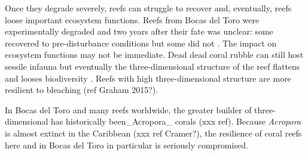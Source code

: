 \documentclass[]{book}
\begin{document}
Once they degrade severely, reefs can struggle to recover and,
eventually, reefs loose important ecosystem functions. Reefs from Bocas
del Toro were experimentally degraded and two years after their fate was
unclear: some recovered to pre-disturbance conditions but some did not
\citep{Schloder_etal_2013}. The impact on ecosystem functions may not be
immediate. Dead dead coral rubble can still host sessile infauna but
eventually the three-dimensional structure of the reef flattens and
looses biodiversity \citep{Nelson_etal_2016}. Reefs with high
three-dimensional structure are more resilient to bleaching (ref Graham
2015?).

In Bocas del Toro and many reefs worldwide, the greater builder of
three-dimensional has historically been\_Acropora\_ corals (xxx ref).
Because \emph{Acropora} is almost extinct in the Caribbean (xxx ref
Cramer?), the resilience of coral reefs here and in Bocas del Toro in
particular is seriously compromised.


\end{document}

